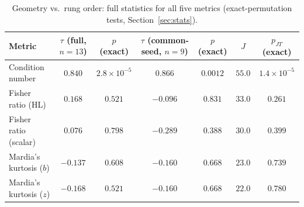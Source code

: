\begin{table}[htbp]
\centering
\caption{Geometry vs.\ rung order: full statistics for all five metrics (exact-permutation tests, Section~\ref{sec:stats}).}
\label{tab:s1-geometry-stats}
\small
\begin{tabular}{lcccccc}
\toprule
Metric & $\tau$ (full, $n=13$) & $p$ (exact) & $\tau$ (common-seed, $n=9$) & $p$ (exact) & $J$ & $p_{JT}$ (exact) \\
\midrule
Condition number             & $0.840$  & $2.8\times10^{-5}$ & $0.866$  & $0.0012$ & $55.0$ & $1.4\times10^{-5}$ \\
Fisher ratio (HL)            & $0.168$  & $0.521$            & $-0.096$ & $0.831$  & $33.0$ & $0.261$ \\
Fisher ratio (scalar)        & $0.076$  & $0.798$            & $-0.289$ & $0.388$  & $30.0$ & $0.399$ \\
Mardia's kurtosis ($b$)      & $-0.137$ & $0.608$            & $-0.160$ & $0.668$  & $23.0$ & $0.739$ \\
Mardia's kurtosis ($z$)      & $-0.168$ & $0.521$            & $-0.160$ & $0.668$  & $22.0$ & $0.780$ \\
\bottomrule
\end{tabular}
\end{table}
